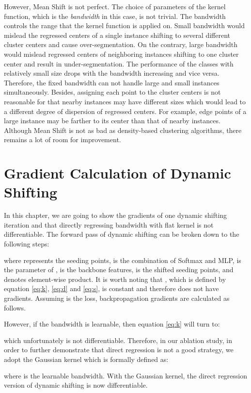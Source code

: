 \documentclass[final]{cvpr}
\begin{document}
However, Mean Shift is not perfect.
The choice of parameters of the kernel function, which is the \textit{bandwidth} in this case, is not trivial.
The bandwidth controls the range that the kernel function is applied on.
Small bandwidth would mislead the regressed centers of a single instance shifting to several different cluster
centers and cause over-segmentation.
On the contrary, large bandwidth would mislead regressed centers of neighboring instances shifting to one cluster
center and result in under-segmentation.
The performance of the classes with relatively small size drops with the bandwidth increasing and vice versa.
Therefore, the fixed bandwidth can not handle large and small instances simultaneously.
Besides, assigning each point to the cluster centers is not reasonable for that nearby instances may have
different sizes which would lead to a different degree of dispersion of regressed centers.
For example, edge points of a large instance may be farther to its center than that of nearby instances.
Although Mean Shift is not as bad as density-based clustering algorithms, there remains a lot of room for improvement.

\section{Gradient Calculation of Dynamic Shifting} \label{sec:2}
In this chapter, we are going to show the gradients of one dynamic shifting iteration and that directly regressing bandwidth
with flat kernel is not differentiable.
The forward pass of dynamic shifting can be broken down to the following steps:

where  represents the seeding points,  is the combination of Softmax and MLP,  is the parameter of , 
is the backbone features,  is the shifted seeding points, and  denotes element-wise product.
It is worth noting that , which is defined by equation \ref{eq:k}, \ref{eq:d} and \ref{eq:s}, is constant and therefore
does not have gradients.
Assuming  is the loss, backpropagation gradients are calculated as follows.


However, if the bandwidth  is learnable, then equation \ref{eq:k} will turn to:

which unfortunately is not differentiable. Therefore, in our ablation study, in order to further demonstrate that direct regression
is not a good strategy, we adopt the Gaussian kernel which is formally defined as:

where  is the learnable bandwidth. With the Gaussian kernel, the direct regression version of dynamic shifting
is now differentiable.
\end{document}
